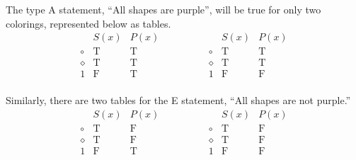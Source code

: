\documentclass[a4paper]{exam}
\newcommand\T{\ensuremath{\mathrm{T}}}
\newcommand\F{\ensuremath{\mathrm{F}}}
\begin{document}
\begin{questions}
    The type A statement, ``All shapes are purple'', will be true for only two colorings, represented below as tables.
  \[
    \begin{array}{c|cc}
      & S(x) & P(x) \\\hline
      \circ & \T & \T \\
      \diamond & \T & \T \\
      1 & \F & \T \\
    \end{array}
    \hspace{50pt} %
    \begin{array}{c|cc}
      & S(x) & P(x) \\\hline
      \circ & \T & \T \\
      \diamond & \T & \T \\
      1 & \F & \F \\
    \end{array}
\]
  
Similarly, there are two tables for the E statement, ``All shapes are not purple.''
  \[
    \begin{array}{c|cc}
      & S(x) & P(x) \\\hline
      \circ & \T & \F \\
      \diamond & \T & \F \\
      1 & \F & \T \\
    \end{array}
    \hspace{50pt} %
    \begin{array}{c|cc}
      & S(x) & P(x) \\\hline
      \circ & \T & \F \\
      \diamond & \T & \F \\
      1 & \F & \F \\
    \end{array}
\]

\begin{parts}

\end{parts}
\end{questions}
\end{document}
